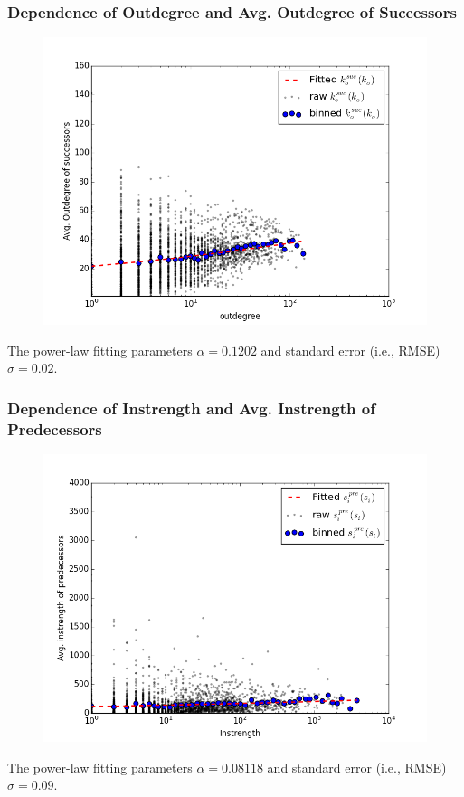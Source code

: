 \documentclass{beamer}
\begin{document}
\begin{frame}
\frametitle{Dependence of Outdegree and Avg. Outdegree of Successors}
\begin{figure}
\includegraphics[width=0.8\linewidth]{figs/suc_out_out_d.png}
\end{figure}
\small{The power-law fitting parameters $\alpha=0.1202$ and standard error (i.e., RMSE) $\sigma=0.02$.}
\end{frame}


\begin{frame}
\frametitle{Dependence of Instrength and Avg. Instrength of Predecessors}
\begin{figure}
\includegraphics[width=0.8\linewidth]{figs/pre_in_in_s.png}
\end{figure}
\small{The power-law fitting parameters $\alpha=0.08118$ and standard error (i.e., RMSE) $\sigma=0.09$.}
\end{frame}
\end{document}
